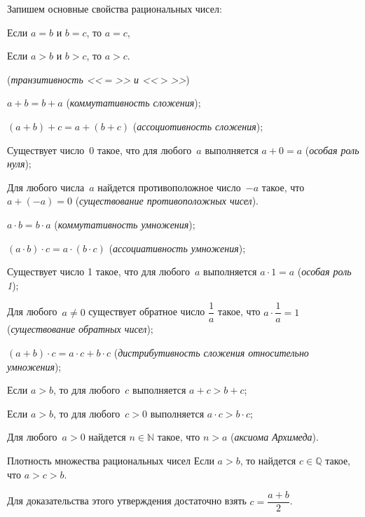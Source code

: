 Запишем основные свойства рациональных чисел:

\begin{properties}
\item Если \(a = b\) и \(b = c\), то \(a = c\),

Если \(a > b\) и \(b > c\), то \(a > c\).

(\textit{транзитивность <<\(=\)>> и <<\(>\)>>})

\item \(a + b = b + a\) (\textit{коммутативность сложения});
\item \((a + b) + c = a + (b + c)\) (\textit{ассоциотивность сложения});
\item Существует число~\(0\) такое, что для любого~\(a\) выполняется \(a + 0 = a\) (\textit{особая
    роль нуля});
\item Для любого числа~\(a\) найдется противоположное число~\(-a\) такое, что \(a + (-a) = 0\)
    (\textit{существование противоположных чисел}).
\item \(a \cdot b = b \cdot a\) (\textit{коммутативность умножения});
\item \((a \cdot b) \cdot c = a \cdot (b \cdot c)\) (\textit{ассоциативность умножения});
\item Существует число 1 такое, что для любого~\(a\) выполняется \(a \cdot 1 = a\) (\textit{особая
    роль 1});
\item Для любого~\(a \neq 0\) существует обратное число \(\dfrac{1}{a}\) такое, что \(a \cdot
    \dfrac{1}{a} = 1\) (\textit{существование обратных чисел});
\item \((a + b) \cdot c = a \cdot c + b \cdot c\) (\textit{дистрибутивность сложения относительно
    умножения});
\item Если \(a > b\), то для любого~\(c\) выполняется \(a + c > b + c\);
\item Если \(a > b\), то для любого~\(c > 0\) выполняется \(a \cdot c > b \cdot c\);
\item Для любого~\(a > 0\) найдется \(n \in \mathbb{N}\) такое, что \(n > a\) (\textit{аксиома
    Архимеда}).
\end{properties}

\begin{mtopic}{Плотность множества рациональных чисел}
Если \(a > b\), то найдется \(c \in \mathbb{Q}\) такое, что \(a > c > b\).

Для доказательства этого утверждения достаточно взять \(c = \dfrac{a + b}{2}\).
\end{mtopic}

